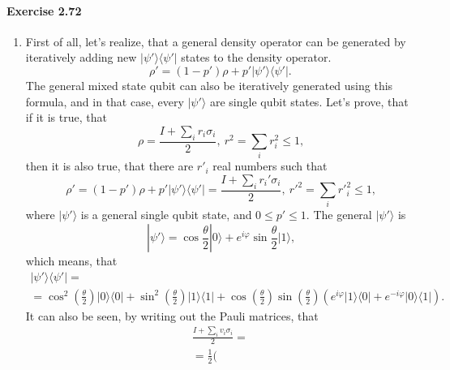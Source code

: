 \documentclass[a4paper,12pt]{article}
\newcommand{\exercise}[1]{\paragraph{Exercise #1}}
\newcommand{\la}{\langle}
\newcommand{\ra}{\rangle}
\begin{document}
    \exercise{2.72} 
    \begin{enumerate}[label=(\arabic*)]

        \item First of all, let's realize, that a general density operator can be generated by iteratively adding new $| \psi' \ra \la \psi' |$ states to the density operator.
            \begin{equation}
                \rho' = (1 - p') \rho + p' |\psi' \ra \la \psi'| \textrm{.}
            \end{equation}
            The general mixed state qubit can also be iteratively generated using this formula, and in that case, every $| \psi' \ra$ are single qubit states. Let's prove, that if it is true, that
            \begin{equation}
                \rho = \frac{I + \sum_i r_i \sigma_i}{2} ,\ r^2 = \sum_i r^2_i \leq 1 \textrm{,}
            \end{equation}
            then it is also true, that there are $r'_i$ real numbers such that
            \begin{equation}
                \rho' = (1 - p') \rho + p' |\psi' \ra \la \psi'| = \frac{I + \sum_i r_i' \sigma_i}{2} ,\ r'^2 = \sum_i r'^2_i \leq 1 \textrm{,}
            \end{equation}
            where $| \psi' \ra$ is a general single qubit state, and $0 \leq p' \leq 1$.
            The general $| \psi' \ra$ is
            \begin{equation}
                | \psi' \ra = \cos \frac{\theta}{2} |0\ra + e^{i \varphi} \sin \frac{\theta}{2} |1\ra \textrm{,}
            \end{equation}
            which means, that
            \begin{gather}
                \nonumber
                | \psi' \ra \la \psi' | =\\
                = \cos^2 \left( \frac{\theta}{2} \right) |0\ra \la 0| +
                \sin^2 \left( \frac{\theta}{2} \right) |1\ra \la 1| +
                \cos \left( \frac{\theta}{2} \right) \sin \left( \frac{\theta}{2} \right) ( e^{i\varphi} |1\ra \la 0| + e^{-i\varphi} |0\ra \la 1| ) \textrm{.}
            \end{gather}
            It can also be seen, by writing out the Pauli matrices, that
            \begin{gather}
                \nonumber
                \frac{I + \sum_i v_i \sigma_i}{2} =\\
                = \frac{1}{2}(

\end{gather}
\end{enumerate}
\end{document}
